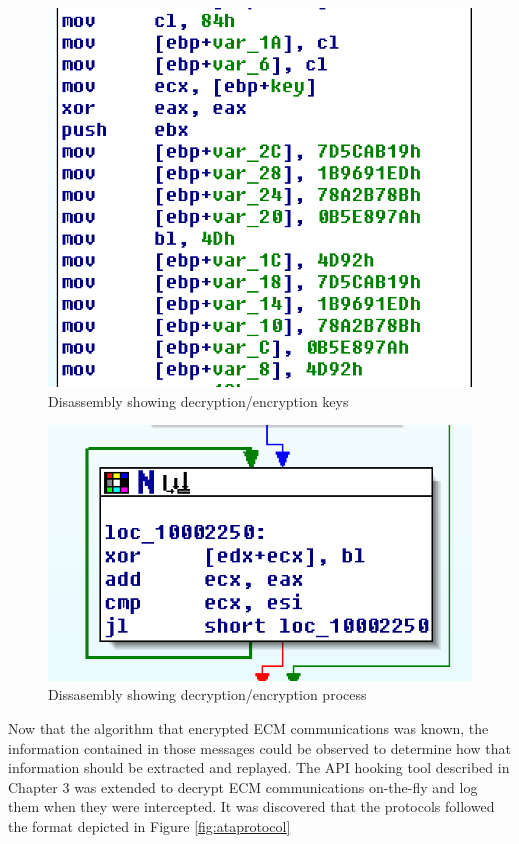 \begin{figure}[h]
  \centering
  \includegraphics{CryptoKeysScreenshot}
  \caption{Disassembly showing decryption/encryption keys}
  \label{fig:atacryptkeys}
\end{figure}

\begin{figure}[h]
  \centering
  \includegraphics{CryptoAlgorithmScreenshot}
  \caption{Dissasembly showing decryption/encryption process}
  \label{fig:atacryptalgorithm}
\end{figure}



Now that the algorithm that encrypted ECM communications was known, the information contained in those
messages could be observed to determine how that information should be extracted and replayed. The
API hooking tool described in Chapter 3 was extended to decrypt ECM communications on-the-fly
and log them when they were intercepted. It was discovered that the protocols followed the format depicted
in Figure \ref{fig:ataprotocol}

